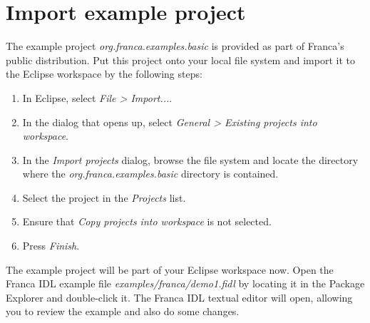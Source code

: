 \documentclass[a4paper,10pt]{scrreprt}
\newlength{\XdocItemIndent}
\begin{document}
\section{Import example project}
\label{GettingStarted_ImportExampleProject}
The example project \textit{org.franca.examples.basic} is provided as part of
Franca's public distribution. Put this project onto your local file system and 
import it to the Eclipse workspace by the following steps:
\setlength{\XdocItemIndent}{\textwidth}
\begin{enumerate}
\addtolength{\XdocItemIndent}{-2.5em}
\item \begin{minipage}[t]{\XdocItemIndent}
In Eclipse, select \textit{File > Import...}.

\end{minipage}
\item \begin{minipage}[t]{\XdocItemIndent}
In the dialog that opens up, select \textit{General > Existing projects into workspace}.

\end{minipage}
\item \begin{minipage}[t]{\XdocItemIndent}
In the \textit{Import projects} dialog, browse the file system and locate the 
	     directory where the \textit{org.franca.examples.basic} directory is contained.

\end{minipage}
\item \begin{minipage}[t]{\XdocItemIndent}
Select the project in the \textit{Projects} list.

\end{minipage}
\item \begin{minipage}[t]{\XdocItemIndent}
Ensure that \textit{Copy projects into workspace} is not selected.

\end{minipage}
\item \begin{minipage}[t]{\XdocItemIndent}
Press \textit{Finish}.

\end{minipage}
\end{enumerate}
\addtolength{\XdocItemIndent}{2.5em}

The example project will be part of your Eclipse workspace now.
Open the Franca IDL example file \textit{examples/franca/demo1.fidl} by locating it
in the Package Explorer and double-click it.
The Franca IDL textual editor will open, allowing you to review the example 
and also do some changes.   
\end{document}
